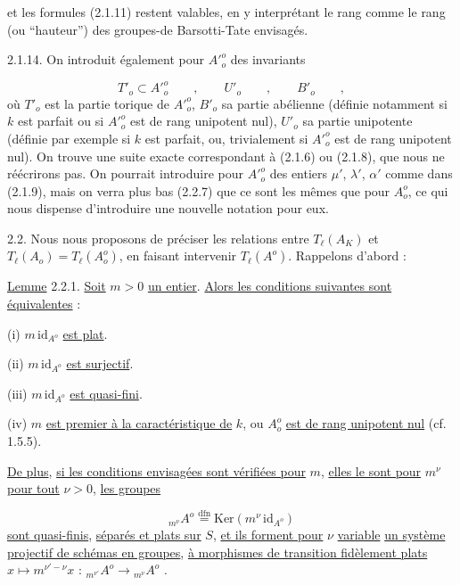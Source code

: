 
et les formules (2.1.11) restent valables, en y interprétant le rang comme le rang (ou ``hauteur'') des groupes-de Barsotti-Tate envisagés.

2.1.14.  On introduit également pour ${A'}^o_o$ des invariants

\begin{equation*}
{T'}_o \subset {A'}^o_o \qquad , \qquad {U'}_o \qquad , \qquad {B'}_o \qquad ,
\end{equation*}
où ${T'}_o$ est la partie torique de ${A'}^o_o$, ${B'}_o$ sa partie abélienne (définie notamment si $k$ est parfait ou si ${A'}^o_o$ est de rang unipotent nul), ${U'}_o$ sa partie unipotente (définie par exemple si $k$ est parfait, ou, trivialement si ${A'}^o_o$ est de rang unipotent nul). On trouve une suite exacte correspondant à (2.1.6) ou (2.1.8), que nous ne réécrirons pas. On pourrait introduire pour ${A'}^o_o$ des entiers $\mu'$, $\lambda'$, $\alpha'$ comme dans (2.1.9), mais on verra plus bas (2.2.7) que ce sont les mêmes que pour $A^o_o$, ce qui nous dispense d'introduire une nouvelle notation pour eux.

2.2.  Nous nous proposons de préciser les relations entre $T_\ell(A_K)$ et $T_\ell(A_o) = T_\ell(A^o_o)$, en faisant intervenir $T_\ell(A^o)$. Rappelons d'abord :

\underline{Lemme} 2.2.1. \underline{Soit} $m > 0$ \underline{un entier}. \underline{Alors les conditions suivantes sont équivalentes} :

(i)   $m \,\mathrm{id}_{A^o}$ \underline{est plat}.

(ii)  $m \,\mathrm{id}_{A^o}$ \underline{est surjectif}.

(iii) $m \,\mathrm{id}_{A^o}$ \underline{est quasi-fini}.

(iv)  $m$ \underline{est premier à la caractéristique de} $k$, ou $A^o_o$ \underline{est de rang unipotent nul} (cf. 1.5.5).

\underline{De plus}, \underline{si les conditions envisagées sont vérifiées pour} $m$, \underline{elles le sont pour} $m^\nu$ \underline{pour tout} $\nu > 0$, \underline{les groupes}



\begin{equation*}
{}_{m^\nu}A^o \overset{\mathrm{dfn}}{=} \mathrm{Ker}(m^\nu \,\mathrm{id}_{A^o})
\end{equation*}
\underline{sont quasi-finis}, \underline{séparés et plats sur} $S$, \underline{et ils forment pour} $\nu$ \underline{variable} \underline{un système projectif de schémas en groupes}, \underline{à morphismes de transition fidèlement plats} $x \longmapsto m^{\nu'-\nu}x$ : ${}_{m^{\nu'}}A^o \longrightarrow {}_{m^\nu}A^o$ .

